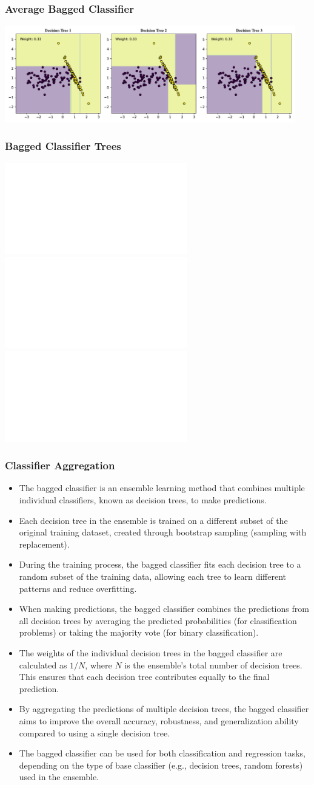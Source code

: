 \documentclass[11pt,aspectratio=1610,usenames,dvipsnames]{beamer} %
\begin{document}
\begin{frame}
	\frametitle{Average Bagged Classifier}

	\includegraphics[width=0.95\textwidth]{./figures/bagged_classifier_decision_regions.pdf}
\end{frame}

\begin{frame}
	\frametitle{Bagged Classifier Trees}

	\includegraphics<1>[height=0.85\textheight]{./figures/decision_tree_1.pdf}
	\includegraphics<2>[height=0.85\textheight]{./figures/decision_tree_2.pdf}
	\includegraphics<3>[height=0.85\textheight]{./figures/decision_tree_3.pdf}

\end{frame}



\begin{frame}[allowframebreaks]
	\frametitle{Classifier Aggregation}

	\begin{itemize}
		\item The bagged classifier is an ensemble learning method that combines multiple individual classifiers, known as decision trees, to make predictions.
		\item Each decision tree in the ensemble is trained on a different subset of the original training dataset, created through bootstrap sampling (sampling with replacement).
		\item During the training process, the bagged classifier fits each decision tree to a random subset of the training data, allowing each tree to learn different patterns and reduce overfitting.
		\item When making predictions, the bagged classifier combines the predictions from all decision trees by averaging the predicted probabilities (for classification problems) or taking the majority vote (for binary classification).
		\item The weights of the individual decision trees in the bagged classifier are calculated as $1/N$, where $N$ is the ensemble's total number of decision trees. This ensures that each decision tree contributes equally to the final prediction.
		\item By aggregating the predictions of multiple decision trees, the bagged classifier aims to improve the overall accuracy, robustness, and generalization ability compared to using a single decision tree.
		\item The bagged classifier can be used for both classification and regression tasks, depending on the type of base classifier (e.g., decision trees, random forests) used in the ensemble.
		\end{itemize}

\end{frame}
\end{document}
